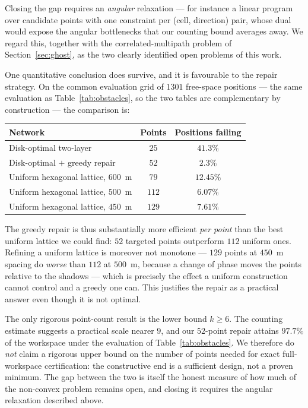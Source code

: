\documentclass[preprint,12pt,3p]{elsarticle}
\theoremstyle{definition}
\begin{document}
Closing the gap requires an \emph{angular} relaxation --- for instance a linear program over
candidate points with one constraint per (cell, direction) pair, whose dual would expose the
angular bottlenecks that our counting bound averages away. We regard this, together with the
correlated-multipath problem of Section~\ref{sec:ghost}, as the two clearly identified open
problems of this work.

One quantitative conclusion does survive, and it is favourable to the repair strategy. On the
common evaluation grid of $1301$ free-space positions --- the same evaluation as
Table~\ref{tab:obstacles}, so the two tables are complementary by construction --- the comparison
is:

\begin{center}
\small
\begin{tabular}{lcc}
\toprule
Network & Points & Positions failing \\
\midrule
Disk-optimal two-layer              & $25$  & $41.3\%$ \\
Disk-optimal $+$ greedy repair      & $52$  & $\bm{2.3\%}$ \\
Uniform hexagonal lattice, $600$~m  & $79$  & $12.45\%$ \\
Uniform hexagonal lattice, $500$~m  & $112$ & $6.07\%$ \\
Uniform hexagonal lattice, $450$~m  & $129$ & $7.61\%$ \\
\bottomrule
\end{tabular}
\end{center}

The greedy repair is thus substantially more efficient \emph{per point} than the best uniform
lattice we could find: $52$ targeted points outperform $112$ uniform ones. Refining a uniform
lattice is moreover not monotone --- $129$ points at $450$~m spacing do \emph{worse} than $112$ at
$500$~m, because a change of phase moves the points relative to the shadows --- which is precisely
the effect a uniform construction cannot control and a greedy one can. This justifies the repair
as a practical answer even though it is not optimal.

The only rigorous point-count result is the lower bound $k\ge6$. The counting estimate suggests a
practical scale nearer $9$, and our $52$-point repair attains $97.7\%$ of the workspace under the
evaluation of Table~\ref{tab:obstacles}. We therefore do \emph{not} claim a rigorous upper bound
on the number of points needed for exact full-workspace certification: the constructive end is a
sufficient design, not a proven minimum. The gap between the two is itself the honest measure of
how much of the non-convex problem remains open, and closing it requires the angular relaxation
described above.
\end{document}
